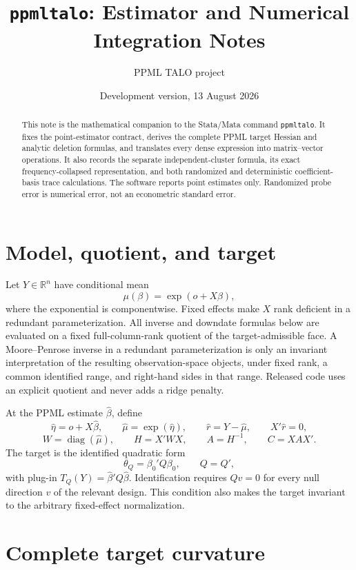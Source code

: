 \documentclass[11pt]{article}
\title{\texttt{ppmltalo}: Estimator and Numerical Integration Notes}
\author{PPML TALO project}
\date{Development version, 13 August 2026}
\newcommand{\diag}{\operatorname{diag}}
\newcommand{\R}{\mathbb R}
\begin{document}
\maketitle

\begin{abstract}
This note is the mathematical companion to the Stata/Mata command
\texttt{ppmltalo}.  It fixes the point-estimator contract, derives the complete
PPML target Hessian and analytic deletion formulas, and translates every dense
expression into matrix--vector operations.  It also records the separate
independent-cluster formula, its exact frequency-collapsed representation, and
both randomized and deterministic coefficient-basis trace calculations.  The
software reports point estimates only.  Randomized probe error is numerical
error, not an econometric standard error.
\end{abstract}

\section{Model, quotient, and target}

Let $Y\in\R^n$ have conditional mean
\[
 \mu(\beta)=\exp(o+X\beta),
\]
where the exponential is componentwise.  Fixed effects make $X$ rank
deficient in a redundant parameterization.  All inverse and downdate formulas
below are evaluated on a fixed full-column-rank quotient of the
target-admissible face.  A Moore--Penrose inverse in a redundant
parameterization is only an invariant interpretation of the resulting
observation-space objects, under fixed rank, a common identified range, and
right-hand sides in that range.  Released code uses an explicit quotient and
never adds a ridge penalty.

At the PPML estimate $\widehat\beta$, define
\[
 \widehat\eta=o+X\widehat\beta,\qquad
 \widehat\mu=\exp(\widehat\eta),\qquad
 \widehat r=Y-\widehat\mu,\qquad X'\widehat r=0,
\]
\[
 W=\diag(\widehat\mu),\qquad H=X'WX,\qquad A=H^{-1},
 \qquad C=XAX'.
\]
The target is the identified quadratic form
\[
 \theta_Q=\beta_0'Q\beta_0,
 \qquad Q=Q',
\]
with plug-in $T_Q(Y)=\widehat\beta'Q\widehat\beta$.  Identification requires
$Qv=0$ for every null direction $v$ of the relevant design.  This condition
also makes the target invariant to the arbitrary fixed-effect normalization.

\section{Complete target curvature}
\end{document}
